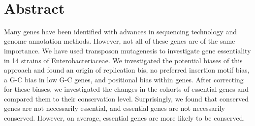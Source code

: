\documentclass[12pt,letterpaper]{article}
\begin{document}
\vspace*{0.35in}

\begin{flushleft}
{\Large
\textbf{}
}
\newline
\\

\end{flushleft}

\section*{Abstract}
Many genes have been identified with advances in sequencing technology and genome annotation methods. However, not all of these genes are of the same importance. We have used transposon mutagenesis to investigate gene essentiality in 14 strains of Enterobacteriaceae. We investigated the potential biases of this approach and found an origin of replication bis, no preferred insertion motif bias, a G-C bias in low G-C genes,  and positional bias within genes. After correcting for these biases, we investigated the changes in the cohorts of essential genes and compared them to their conservation level. Surprisingly, we found that conserved genes are not necessarily essential, and essential genes are not necessarily conserved. However, on average, essential genes are more likely to be conserved.

\linenumbers

\end{document}
